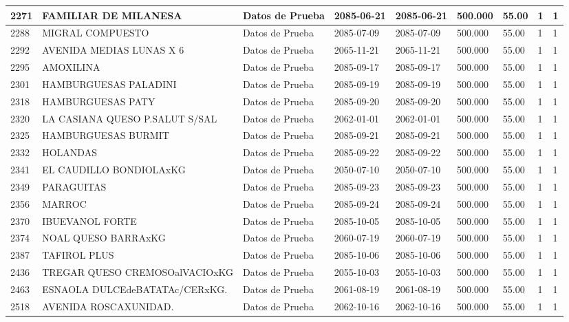 \documentclass[a4paper,12pt]{article}
\begin{document}
\begin{landscape}
\begin{longtable}{|p{4cm}|p{2.5cm}|p{2.5cm}|p{1.8cm}|p{1.8cm}|p{1cm}|p{1cm}|p{3cm}|p{3cm}||}
2271 & FAMILIAR  DE  MILANESA & Datos de Prueba & 2085-06-21 & 2085-06-21 & 500.000 & 55.00 & 1 & 1 \\ \hline 
2288 & MIGRAL   COMPUESTO & Datos de Prueba & 2085-07-09 & 2085-07-09 & 500.000 & 55.00 & 1 & 1 \\ \hline 
2292 & AVENIDA MEDIAS LUNAS X 6 & Datos de Prueba & 2065-11-21 & 2065-11-21 & 500.000 & 55.00 & 1 & 1 \\ \hline 
2295 & AMOXILINA & Datos de Prueba & 2085-09-17 & 2085-09-17 & 500.000 & 55.00 & 1 & 1 \\ \hline 
2301 & HAMBURGUESAS PALADINI & Datos de Prueba & 2085-09-19 & 2085-09-19 & 500.000 & 55.00 & 1 & 1 \\ \hline 
2318 & HAMBURGUESAS  PATY & Datos de Prueba & 2085-09-20 & 2085-09-20 & 500.000 & 55.00 & 1 & 1 \\ \hline 
2320 & LA CASIANA QUESO P.SALUT S/SAL & Datos de Prueba & 2062-01-01 & 2062-01-01 & 500.000 & 55.00 & 1 & 1 \\ \hline 
2325 & HAMBURGUESAS  BURMIT & Datos de Prueba & 2085-09-21 & 2085-09-21 & 500.000 & 55.00 & 1 & 1 \\ \hline 
2332 & HOLANDAS & Datos de Prueba & 2085-09-22 & 2085-09-22 & 500.000 & 55.00 & 1 & 1 \\ \hline 
2341 & EL CAUDILLO BONDIOLAxKG & Datos de Prueba & 2050-07-10 & 2050-07-10 & 500.000 & 55.00 & 1 & 1 \\ \hline 
2349 & PARAGUITAS & Datos de Prueba & 2085-09-23 & 2085-09-23 & 500.000 & 55.00 & 1 & 1 \\ \hline 
2356 & MARROC & Datos de Prueba & 2085-09-24 & 2085-09-24 & 500.000 & 55.00 & 1 & 1 \\ \hline 
2370 & IBUEVANOL   FORTE & Datos de Prueba & 2085-10-05 & 2085-10-05 & 500.000 & 55.00 & 1 & 1 \\ \hline 
2374 & NOAL QUESO BARRAxKG & Datos de Prueba & 2060-07-19 & 2060-07-19 & 500.000 & 55.00 & 1 & 1 \\ \hline 
2387 & TAFIROL  PLUS & Datos de Prueba & 2085-10-06 & 2085-10-06 & 500.000 & 55.00 & 1 & 1 \\ \hline 
2436 & TREGAR QUESO CREMOSOalVACIOxKG & Datos de Prueba & 2055-10-03 & 2055-10-03 & 500.000 & 55.00 & 1 & 1 \\ \hline 
2463 & ESNAOLA DULCEdeBATATAc/CERxKG. & Datos de Prueba & 2061-08-19 & 2061-08-19 & 500.000 & 55.00 & 1 & 1 \\ \hline 
2518 & AVENIDA ROSCAXUNIDAD. & Datos de Prueba & 2062-10-16 & 2062-10-16 & 500.000 & 55.00 & 1 & 1 \\ \hline 

\end{longtable}
\end{landscape}
\end{document}
